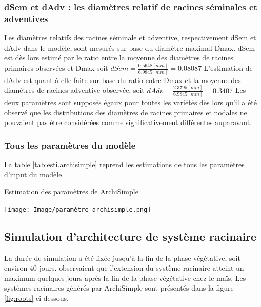 \subsubsection{dSem et dAdv : les diamètres relatif de racines séminales et adventives}

Les diamètres relatifs des racines séminale et adventive, respectivement dSem et dAdv dans le modèle, sont mesurés sur base du diamètre maximal Dmax.
dSem est dès lors estimé par le ratio entre la moyenne des diamètres de racines primaires observées et Dmax soit $dSem=\frac{0.5648[mm]}{6.9845[mm]} = 0.08087$
L'estimation de dAdv est quant à elle faite sur base du ratio entre Dmax et la moyenne des diamètres de racines adventive observée, soit $dAdv = \frac{2.3795[mm]}{6.9845[mm]} = 0.3407$
Les deux paramètres sont supposés égaux pour toutes les variétés dès lors qu'il a été observé que les distributions des diamètres de racines primaires et nodales ne pouvaient pas être considérées comme significativement différentes auparavant.

\subsubsection{Tous les paramètres du modèle}

La table \ref{tab:esti.archisimple} reprend les estimations de tous les paramètres d'input du modèle.

\begin{table}[ht]
    \centering
    \caption{Estimation des paramètres de ArchiSimple}
    \texttt{[image: Image/paramètre archisimple.png]}
    \label{tab:esti.archisimple}
\end{table}

\subsection{Simulation d'architecture de système racinaire}
La durée de simulation a été fixée jusqu'à la fin de la phase végétative, soit environ 40 jours.
\cite{pellerinand_evaluation_1994} observaient que l'extension du système racinaire atteint un maximum quelques jours après la fin de la phase végétative chez le maïs.
Les systèmes racinaires générés par ArchiSimple sont présentés dans la figure \ref{fig:roots} ci-dessous.
\newpage

